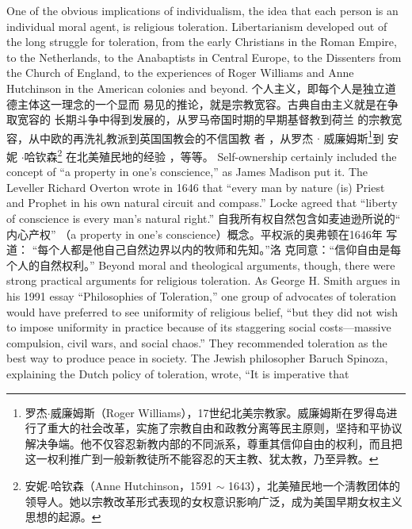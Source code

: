 \begin{paracol}{2}
One of the obvious implications of individualism, the idea that
each person is an individual moral agent, is religious toleration.
Libertarianism developed out of the long struggle for toleration, from the early Christians in the Roman Empire, to the Netherlands, to the Anabaptists in Central Europe, to the Dissenters from the Church of England, to the experiences of
Roger Williams and Anne Hutchinson in the American colonies
and beyond.
\switchcolumn
个人主义，即每个人是独立道德主体这一理念的一个显而
易见的推论，就是宗教宽容。古典自由主义就是在争取宽容的
长期斗争中得到发展的，从罗马帝国时期的早期基督教到荷兰
的宗教宽容，从中欧的再洗礼教派到英国国教会的不信国教
者 ，从罗杰 $\cdot$ 威廉姆斯\footnote{罗杰$\cdot$威廉姆斯（Roger Williams），17世纪北美宗教家。威廉姆斯在罗得岛进行了重大的社会改革，实施了宗教自由和政教分离等民主原则，坚持和平协议解决争端。他不仅容忍新教内部的不同派系，尊重其信仰自由的权利，而且把这一权利推广到一般新教徒所不能容忍的天主教、犹太教，乃至异教。}到 安 妮 $\cdot$哈钦森\footnote{安妮$\cdot$哈钦森（Anne Hutchinson，1591 $\sim$ 1643），北美殖民地一个淸教团体的领导人。她以宗教改革形式表现的女权意识影响广泛，成为美国早期女权主义思想的起源。} 在北美殖民地的经验 ，等等。
\switchcolumn*
Self-ownership certainly included the concept of ``a property
in one's conscience,'' as James Madison put it. The Leveller Richard Overton wrote in 1646 that ``every man by nature (is)
Priest and Prophet in his own natural circuit and compass.'' Locke agreed that ``liberty of conscience is every man's natural right.''
\switchcolumn
自我所有权自然包含如麦迪逊所说的“ 内心产权”  （a
property in one’s conscience）概念。平权派的奥弗顿在1646年
写道： “每个人都是他自己自然边界以内的牧师和先知。”洛
克同意：“信仰自由是每个人的自然权利。”
\switchcolumn*
Beyond moral and theological arguments, though, there
were strong practical arguments for religious toleration. As
George H. Smith argues in his 1991 essay ``Philosophies of Toleration,'' one group of advocates of toleration would have preferred to see uniformity of religious belief, ``but they did not
wish to impose uniformity in practice because of its staggering
social costs---massive compulsion, civil wars, and social chaos.''
They recommended toleration as the best way to produce peace
in society. The Jewish philosopher Baruch Spinoza, explaining
the Dutch policy of toleration, wrote, ``It is imperative that

\end{paracol}
